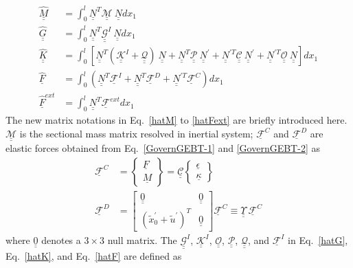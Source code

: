 \documentclass{aiaa-tc}
\newcommand{\tens}[1]{\underline{\underline{#1}}}
\renewcommand{\vec}[1]{\underline{#1}}
\begin{document}
\begin{align}
	\label{hatM} 
	\hat{\tens{M}}&= \int_0^l \underline{\underline{N}}^T \mathcal{\underline{\underline{M}}} ~\underline{\underline{N}} dx_1 \\
	\label{hatG}
	\hat{\tens{G}} &= \int_0^l \tens{N}^T \tens{\mathcal{G}}^I~\tens{N} dx_1\\ 
	\label{hatK}
	\hat{\tens{K}}&=\int_0^l \left[ \tens{N}^T (\tens{\mathcal{K}}^I + \mathcal{\tens{Q}})~ \tens{N} + \tens{N}^T \mathcal{\tens{P}}~ \tens{N}^\prime + \tens{N}^{\prime T} \mathcal{\tens{C}}~ \tens{N}^\prime + \tens{N}^{\prime T} \mathcal{\tens{O}}~ \tens{N} \right] d x_1 \\	
	\label{hatF}
	\hat{\vec{F}} &= \int_0^l (\tens{N}^T \vec{\mathcal{F}}^I + \tens{N}^T \mathcal{\vec{F}}^D + \tens{N}^{\prime T} \mathcal{\vec{F}}^C)dx_1 \\
	\label{hatFext}
	\hat{\vec{F}}^{ext}& = \int_0^l \tens{N}^T \mathcal{\vec{F}}^{ext} dx_1 
\end{align}
The new matrix notations in Eq.~\eqref{hatM} to \eqref{hatFext} are briefly
introduced here. $\mathcal{\tens{M}}$ is the sectional mass matrix resolved
in inertial system; $\mathcal{\vec{F}}^C$ and $\mathcal{\vec{F}}^D$ are
elastic forces obtained from Eq.~\eqref{GovernGEBT-1} and
\eqref{GovernGEBT-2} as
\begin{align}
	\label{FC}
	\mathcal{\vec{F}}^C &= \begin{Bmatrix}
         \vec{F} \\
	\vec{M}
	\end{Bmatrix} = \tens{\mathcal{C}} \begin{Bmatrix}
	\vec{\epsilon} \\
	\vec{\kappa}
	\end{Bmatrix} \\
	\label{FD}
	\mathcal{\vec{F}}^D & = \begin{bmatrix}
	\underline{\underline{0}} & \underline{\underline{0}}\\
	(\tilde{x}_0^\prime+\tilde{u}^\prime)^T & \underline{\underline{0}}
	\end{bmatrix}
	\mathcal{\vec{F}}^C \equiv \tens{\Upsilon}~ \mathcal{\vec{F}}^C
\end{align}
where $\underline{\underline{0}}$ denotes a $3 \times 3$ null matrix. The $\tens{\mathcal{G}}^I$, $\tens{\mathcal{K}}^I$,  $\mathcal{\tens{O}}$, $\mathcal{\tens{P}}$, $\mathcal{\tens{Q}}$, and $\vec{\mathcal{F}}^I$ in Eq.~\eqref{hatG}, Eq.~\eqref{hatK}, and Eq.~\eqref{hatF} are defined as
\end{document}
